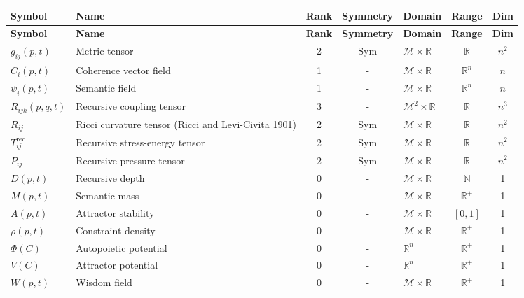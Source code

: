 {\small
\renewcommand{\arraystretch}{1.1}
\begin{longtable}{|l|p{4.5cm}|c|c|p{2cm}|c|c|}
\hline
\textbf{Symbol} & \textbf{Name} & \textbf{Rank} & \textbf{Symmetry} & \textbf{Domain} & \textbf{Range} & \textbf{Dim} \\
\hline
\endfirsthead
\hline
\textbf{Symbol} & \textbf{Name} & \textbf{Rank} & \textbf{Symmetry} & \textbf{Domain} & \textbf{Range} & \textbf{Dim} \\
\hline
\endhead
\(g_{ij}(p,t)\) & Metric tensor & 2 & Sym & \(\mathcal{M} \times \mathbb{R}\) & \(\mathbb{R}\) & \(n^2\) \\
\hline
\(C_i(p,t)\) & Coherence vector field & 1 & - & \(\mathcal{M} \times \mathbb{R}\) & \(\mathbb{R}^n\) & \(n\) \\
\hline
\(\psi_i(p,t)\) & Semantic field & 1 & - & \(\mathcal{M} \times \mathbb{R}\) & \(\mathbb{R}^n\) & \(n\) \\
\hline
\(R_{ijk}(p,q,t)\) & Recursive coupling tensor & 3 & - & \(\mathcal{M}^2 \times \mathbb{R}\) & \(\mathbb{R}\) & \(n^3\) \\
\hline
\(R_{ij}\) & Ricci curvature tensor (Ricci and Levi-Civita 1901) & 2 & Sym & \(\mathcal{M} \times \mathbb{R}\) & \(\mathbb{R}\) & \(n^2\) \\
\hline
\(T_{ij}^{\text{rec}}\) & Recursive stress-energy tensor & 2 & Sym & \(\mathcal{M} \times \mathbb{R}\) & \(\mathbb{R}\) & \(n^2\) \\
\hline
\(P_{ij}\) & Recursive pressure tensor & 2 & Sym & \(\mathcal{M} \times \mathbb{R}\) & \(\mathbb{R}\) & \(n^2\) \\
\hline
\(D(p,t)\) & Recursive depth & 0 & - & \(\mathcal{M} \times \mathbb{R}\) & \(\mathbb{N}\) & 1 \\
\hline
\(M(p,t)\) & Semantic mass & 0 & - & \(\mathcal{M} \times \mathbb{R}\) & \(\mathbb{R}^+\) & 1 \\
\hline
\(A(p,t)\) & Attractor stability & 0 & - & \(\mathcal{M} \times \mathbb{R}\) & \([0,1]\) & 1 \\
\hline
\(\rho(p,t)\) & Constraint density & 0 & - & \(\mathcal{M} \times \mathbb{R}\) & \(\mathbb{R}^+\) & 1 \\
\hline
\(\Phi(C)\) & Autopoietic potential & 0 & - & \(\mathbb{R}^n\) & \(\mathbb{R}^+\) & 1 \\
\hline
\(V(C)\) & Attractor potential & 0 & - & \(\mathbb{R}^n\) & \(\mathbb{R}^+\) & 1 \\
\hline
\(W(p,t)\) & Wisdom field & 0 & - & \(\mathcal{M} \times \mathbb{R}\) & \(\mathbb{R}^+\) & 1 \\

\end{longtable}}
